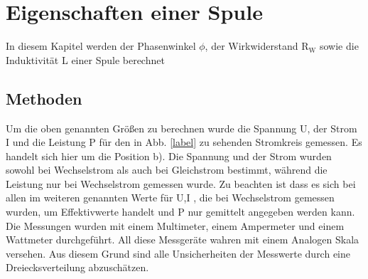 \section{Eigenschaften einer Spule}
In diesem Kapitel werden der Phasenwinkel $\phi$, der Wirkwiderstand R$_\text{W}$ sowie die Induktivität L einer Spule berechnet

\subsection{Methoden}
Um die oben genannten Größen zu berechnen wurde die Spannung U, der Strom I und die Leistung P für den in Abb. \ref{label} zu sehenden Stromkreis gemessen. Es handelt sich hier um die Position b).
Die Spannung und der Strom wurden sowohl bei Wechselstrom als auch bei Gleichstrom bestimmt, während die Leistung nur bei Wechselstrom gemessen wurde. Zu beachten ist dass es sich bei allen im weiteren genannten Werte für U,I , die bei Wechselstrom gemessen wurden, um Effektivwerte handelt und P nur gemittelt angegeben werden kann.
Die Messungen wurden mit einem Multimeter, einem Ampermeter und einem Wattmeter durchgeführt.
All diese Messgeräte wahren mit einem Analogen Skala versehen. Aus diesem Grund sind alle Unsicherheiten der Messwerte durch eine Dreiecksverteilung abzuschätzen. 
